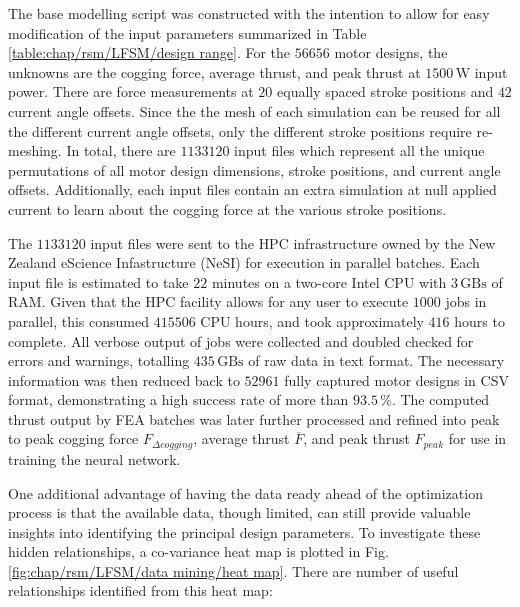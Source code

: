             
            The base modelling script was constructed with the intention to allow for easy modification of the input parameters summarized in Table\,\ref{table:chap/rsm/LFSM/design range}. For the $56656$ motor designs, the unknowns are the cogging force, average thrust, and peak thrust at $1500\,\mathrm{W}$ input power. There are force measurements at $20$ equally spaced stroke positions and $42$ current angle offsets. Since the the mesh of each simulation can be reused for all the different current angle offsets, only the different stroke positions require re-meshing. In total, there are $1133120$ input files which represent all the unique permutations of all motor design dimensions, stroke positions, and current angle offsets. Additionally, each input files contain an extra simulation at null applied current to learn about the cogging force at the various stroke positions. 
            
            
            The $1133120$ input files were sent to the \acf{HPC} infrastructure owned by the New Zealand eScience Infastructure (NeSI) for execution in parallel batches. Each input file is estimated to take $22$ minutes on a two-core Intel CPU with $3\,\mathrm{GBs}$ of RAM. Given that the \acs{HPC} facility allows for any user to execute $1000$ jobs in parallel, this consumed $415506$ CPU hours, and took approximately $416$ hours to complete. All verbose output of jobs were collected and doubled checked for errors and warnings, totalling $435\,\mathrm{GBs}$ of raw data in text format. The necessary information was then reduced back to $52961$ fully captured motor designs in CSV format, demonstrating a high success rate of more than $93.5\,\%$. The computed thrust output by FEA batches was later further processed and refined into peak to peak cogging force $F_{\Delta cogging}$, average thrust $\overline{F}$, and peak thrust $F_{peak}$ for use in training the neural network.
            
            
            One additional advantage of having the data ready ahead of the optimization process is that the available data, though limited, can still provide valuable insights into identifying the principal design parameters. To investigate these hidden relationships, a co-variance heat map is plotted in Fig.\,\ref{fig:chap/rsm/LFSM/data mining/heat map}. There are number of useful relationships identified from this heat map:
            

